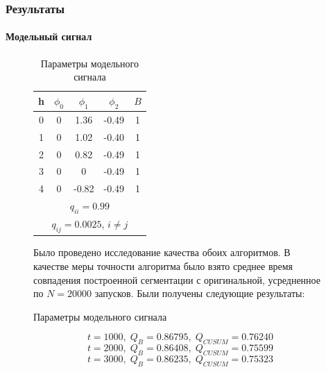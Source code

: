\documentclass[9pt]{beamer}
\begin{document}
\begin{frame}\frametitle{Результаты}
\framesubtitle{Модельный сигнал}
\begin{figure}[h]
\begin{minipage}[h]{0.4\linewidth}
\begin{table}[h]
\caption{Параметры модельного сигнала}
\label{signal_param}
\begin{tabular}{|c|c|c|c|c|}
\hline
h & $\phi_0$ & $\phi_1$ & $\phi_2$ & $B$\\
\hline
0 & 0 & 1.36 & -0.49 & 1\\
\hline
1 & 0 & 1.02 & -0.40 & 1\\
\hline
2 & 0 & 0.82 & -0.49 & 1\\
\hline
3 & 0 & 0 & -0.49 & 1\\
\hline
4 & 0 & -0.82 & -0.49 & 1\\
\hline
\multicolumn{5}{|c|}{$q_{ii} = 0.99$}\\
\hline
\multicolumn{5}{|c|}{$q_{ij} = 0.0025$, $i \neq j$}\\
\hline
\end{tabular}
\end{table}
\end{minipage}
\begin{minipage}[h]{0.4\linewidth}
Было проведено исследование качества обоих алгоритмов. В качестве меры точности алгоритма было взято среднее время совпадения построенной сегментации с оригинальной, усредненное по $N = 20000$ запусков. Были получены следующие результаты:
\end{minipage}
\end{figure}
$$t = 1000,\; Q_B = 0.86795,\; Q_{CUSUM} = 0.76240$$
$$t = 2000,\; Q_B = 0.86408,\; Q_{CUSUM} = 0.75599$$
$$t = 3000,\; Q_B = 0.86235,\; Q_{CUSUM} = 0.75323$$
\end{frame}
\end{document}
